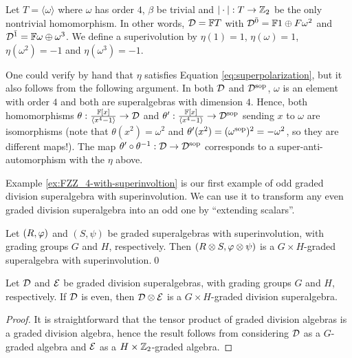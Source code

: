 \begin{ex}\label{ex:FZZ_4-with-superinvoltion}
	Let $T= \langle \omega \rangle$ where $\omega$ has order $4$, $\beta$ be trivial and $| \cdot |: T \to \mathbb{Z}_2$ be the only nontrivial homomorphism. In other words, $\mathcal{D} = \mathbb{F} T$ with $\mathcal{D}^{\bar0} = \mathbb{F} 1 \oplus F \omega^2$ and $\mathcal{D}^{\bar1} = \mathbb{F} \omega \oplus \omega^3$. We define a superivolution by $\eta (1) = 1$, $\eta (\omega) = 1$, $\eta (\omega^2) = -1$ and $\eta(\omega^3) = -1$. %

	One could verify by hand that $\eta$ satisfies Equation \eqref{eq:superpolarization}, but it also follows from the following argument.
	In both $\mathcal{D}$ and $\mathcal{D}^{\mathrm{sop}}$, $\omega$ is an element with order $4$ and both are superalgebras with dimension $4$.
	Hence, both homomorphisms $\theta: \frac{\mathbb{F}[x]}{\langle x^4 - 1 \rangle} \to \mathcal{D}$ and $\theta': \frac{\mathbb{F}[x]}{\langle x^4 - 1 \rangle} \to \mathcal{D}^{\mathrm{sop}}$ sending $x$ to $\omega$ are isomorphisms (note that $\theta(x^2) = \omega^2$ and $\theta'(x^2) = (\omega^{\mathrm{sop}})^2 = - \omega^2$, so they are different maps!).
	The map $\theta'\circ \theta^{-1}: \mathcal{D} \to \mathcal{D}^{\mathrm{sop}}$ corresponds to a super-anti-automorphism with the $\eta$ above.
\end{ex}

Example \ref{ex:FZZ_4-with-superinvoltion} is our first example of odd graded division superalgebra with superinvolution. We can use it to transform any even graded division superalgebra into an odd one by ``extending scalars''.

\begin{lemma}
	Let $(R, \varphi)$ and $(S, \psi)$ be graded superalgebras with superinvolution, with grading groups $G$ and $H$, respectively. Then $(R\otimes S, \varphi\otimes \psi)$ is a $G\times H$-graded superalgebra with superinvolution.\qed
\end{lemma}

\begin{lemma}
	Let $\mathcal{D}$ and $\mathcal E$ be graded division superalgebras, with grading groups $G$ and $H$, respectively. If $\mathcal{D}$ is even, then $\mathcal{D} \otimes \mathcal E$ is a $G\times H$-graded division superalgebra.
\end{lemma}

\begin{proof}
	It is straightforward that the tensor product of graded division algebras is a graded division algebra, hence the result follows from considering $\mathcal{D}$ as a $G$-graded algebra and $\mathcal E$ as a $H\times \mathbb{Z}_2$-graded algebra.
\end{proof}

